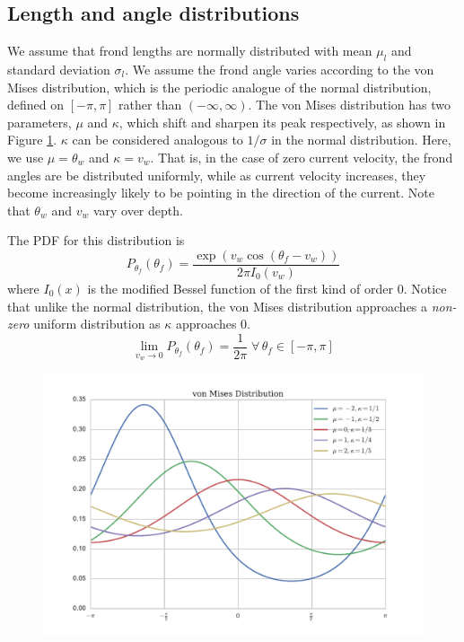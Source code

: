 \subsection{Length and angle distributions}
\label{sec:angle_dist}
We assume that frond lengths are normally distributed with mean $\mu_l$ and standard deviation $\sigma_l$.
We assume the frond angle varies according to the von Mises distribution, which is the periodic analogue of the normal distribution, defined on $[-\pi,\pi]$ rather than $(-\infty,\infty)$.
The von Mises distribution has two parameters, $\mu$ and $\kappa$, which shift and sharpen its peak respectively, as shown in Figure \ref{fig:vonmises}.
$\kappa$ can be considered analogous to $1/\sigma$ in the normal distribution.
Here, we use $\mu = \theta_w$ and $\kappa = v_w$.
That is, in the case of zero current velocity, the frond angles are be distributed uniformly, while as current velocity increases, they become increasingly likely to be pointing in the direction of the current.
Note that $\theta_w$ and $v_w$ vary over depth.

The PDF for this distribution is
\begin{equation}
	P_{\theta_f}(\theta_f) = \frac{\exp\left(v_w\cos(\theta_f-v_w)\right)}{2\pi I_0(v_w)}
\end{equation}
where $I_0(x)$ is the modified Bessel function of the first kind of order 0.
Notice that unlike the normal distribution, the von Mises distribution approaches a \textit{non-zero} uniform distribution as $\kappa$ approaches 0.
\begin{equation}
	\displaystyle \lim_{v_w \to 0}P_{\theta_f}(\theta_f) = \frac{1}{2\pi} \;\forall\, \theta_f \in [-\pi,\pi]
\end{equation}

\begin{figure}[h]
	\centering
	\includegraphics[width=.75\linewidth]{vonmises_2}
	\label{fig:vonmises}
\end{figure}

